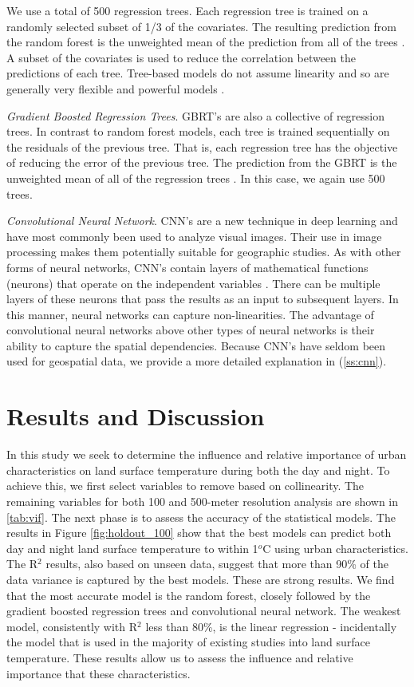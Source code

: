 \documentclass[final,3p,times,twocolumn,sort&compress]{elsarticle}
\begin{document}
We use a total of 500 regression trees.
Each regression tree is trained on a randomly selected subset of 1/3 of the covariates. 
The resulting prediction from the random forest is the unweighted mean of the prediction from all of the trees \cite{Breiman2001-rt}.
A subset of the covariates is used to reduce the correlation between the predictions of each tree.
Tree-based models do not assume linearity and so are generally very flexible and powerful models \cite{Breiman2001-rt, Geron2017-ek}.

\textit{Gradient Boosted Regression Trees}. 
GBRT's are also a collective of regression trees. 
In contrast to random forest models, each tree is trained sequentially on the residuals of the previous tree.
That is, each regression tree has the objective of reducing the error of the previous tree.
The prediction from the GBRT is the unweighted mean of all of the regression trees \cite{Geron2017-ek}.
In this case, we again use 500 trees.

\textit{Convolutional Neural Network}. 
CNN's are a new technique in deep learning and have most commonly been used to analyze visual images.
Their use in image processing makes them potentially suitable for geographic studies.
As with other forms of neural networks, CNN's contain layers of mathematical functions (neurons) that operate on the independent variables \cite{Geron2017-ek}.
There can be multiple layers of these neurons that pass the results as an input to subsequent layers.
In this manner, neural networks can capture non-linearities.
The advantage of convolutional neural networks above other types of neural networks is their ability to capture the spatial dependencies. 
Because CNN's have seldom been used for geospatial data, we provide a more detailed explanation in (\ref{ss:cnn}).

\section{Results and Discussion}
In this study we seek to determine the influence and relative importance of urban characteristics on land surface temperature during both the day and night.
To achieve this, we first select variables to remove based on collinearity. 
The remaining variables for both 100 and 500-meter resolution analysis are shown in \ref{tab:vif}. 
The next phase is to assess the accuracy of the statistical models.
The results in Figure \ref{fig:holdout_100} show that the best models can predict both day and night land surface temperature to within 1$^o$C using urban characteristics.
The R$^2$ results, also based on unseen data, suggest that more than 90\% of the data variance is captured by the best models.
These are strong results.
We find that the most accurate model is the random forest, closely followed by the gradient boosted regression trees and convolutional neural network.
The weakest model, consistently with R$^2$ less than 80\%, is the linear regression - incidentally the model that is used in the majority of existing studies into land surface temperature.
These results allow us to assess the influence and relative importance that these characteristics.
\end{document}
